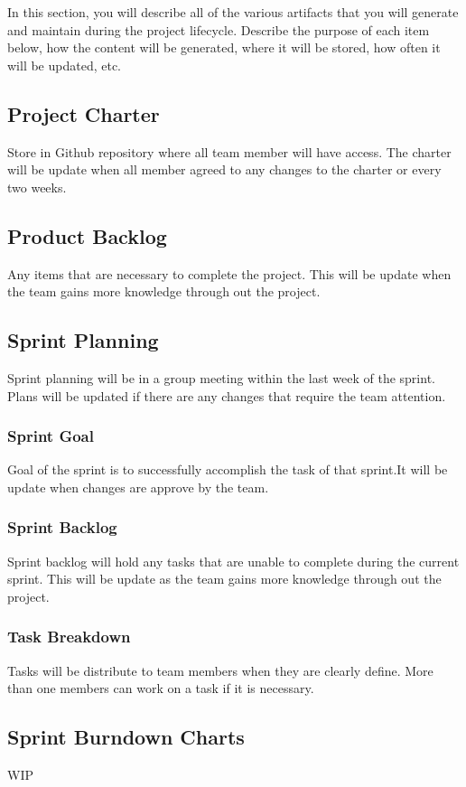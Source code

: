 In this section, you will describe all of the various artifacts that you will generate and maintain during the project lifecycle. Describe the purpose of each item below, how the content will be generated, where it will be stored, how often it will be updated, etc. 

\subsection{Project Charter}
Store in Github repository where all team member will have access.
The charter will be update when all member agreed to any changes to the charter or every two weeks.

\subsection{Product Backlog}
Any items that are necessary to complete the project. This will be update when the team gains more knowledge through out the project.

\subsection{Sprint Planning}
Sprint planning will be in a group meeting within the last week of the sprint. Plans will be updated if there are any changes that require the team attention.

\subsubsection{Sprint Goal}
Goal of the sprint is to successfully accomplish the task of that sprint.It will be update when changes are approve by the team.

\subsubsection{Sprint Backlog}
Sprint backlog will hold any tasks that are unable to complete during the current sprint. This will be update as the team gains more knowledge through out the project.

\subsubsection{Task Breakdown}
Tasks will be distribute to team members when they are clearly define. More than one members can work on a task if it is necessary.

\subsection{Sprint Burndown Charts}
WIP

